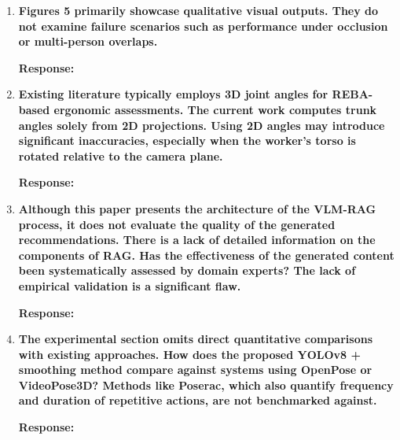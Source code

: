 \begin{enumerate}
    \textbf{Response:} We thank the reviewer for this comment. A detailed methodology paragraph has been added to Section 3.4 describing: (1) the dot-product angle formula applied to pairs of smoothed 2D keypoint vectors; (2) the six body-segment angle definitions with their specific keypoint pairs (e.g., trunk: hip-midpoint to shoulder-midpoint vector against vertical); (3) all REBA segment scoring thresholds (trunk score 1 for $<5^\circ$, 2 for $5^\circ$--$20^\circ$, 3 for $20^\circ$--$60^\circ$, 4 for $>60^\circ$; neck score 1 for $\leq20^\circ$, 2 for $>20^\circ$; upper arm score 1--4 per $<20^\circ/20^\circ$--$45^\circ/45^\circ$--$90^\circ/>90^\circ$); and (4) the Table A to Score A, Table B to Score B, Table C to final REBA lookup procedure. The RAG implementation is fully specified in Section 3.5: ChromaDB vector database, all-MiniLM-L6-v2 embeddings, gpt-4-turbo language model, and Streamlit interface.

    \item \textbf{Figures 5 primarily showcase qualitative visual outputs. They do not examine failure scenarios such as performance under occlusion or multi-person overlaps.}

    \textbf{Response:}

    \item \textbf{Existing literature typically employs 3D joint angles for REBA-based ergonomic assessments. The current work computes trunk angles solely from 2D projections. Using 2D angles may introduce significant inaccuracies, especially when the worker's torso is rotated relative to the camera plane.}

    \textbf{Response:}

    \item \textbf{Although this paper presents the architecture of the VLM-RAG process, it does not evaluate the quality of the generated recommendations. There is a lack of detailed information on the components of RAG. Has the effectiveness of the generated content been systematically assessed by domain experts? The lack of empirical validation is a significant flaw.}

    \textbf{Response:}

    \item \textbf{The experimental section omits direct quantitative comparisons with existing approaches. How does the proposed YOLOv8 + smoothing method compare against systems using OpenPose or VideoPose3D? Methods like Poserac, which also quantify frequency and duration of repetitive actions, are not benchmarked against.}

    \textbf{Response:}
\end{enumerate}

